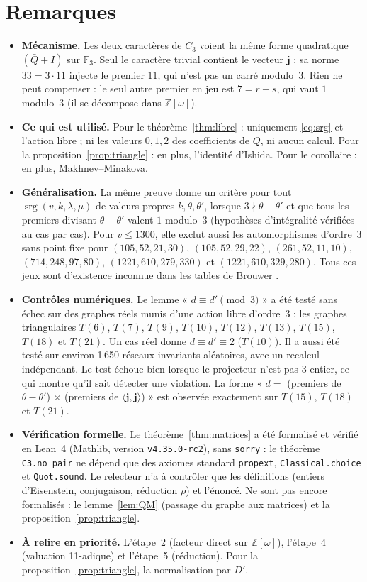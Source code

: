 \documentclass[11pt,a4paper]{article}
\theoremstyle{remark}
\newcommand{\Z}{\mathbb{Z}}
\newcommand{\F}{\mathbb{F}}
\newcommand{\one}{\mathbf{j}}
\newcommand{\srg}{\operatorname{srg}}
\begin{document}
\section{Remarques}

\begin{itemize}[leftmargin=*]
\item \textbf{Mécanisme.} Les deux caractères de $C_3$ voient la même forme quadratique $(\bar Q+I)$ sur $\F_3$. Seul le
caractère trivial contient le vecteur $\one$ ; sa norme $33=3\cdot11$ injecte le premier $11$, qui n'est pas un carré modulo~3.
Rien ne peut compenser : le seul autre premier en jeu est $7=r-s$, qui vaut $1$ modulo~3 (il se décompose dans $\Z[\omega]$).
\item \textbf{Ce qui est utilisé.} Pour le théorème~\ref{thm:libre} : uniquement \eqref{eq:srg} et l'action libre ; ni les valeurs
$0,1,2$ des coefficients de $Q$, ni aucun calcul. Pour la proposition~\ref{prop:triangle} : en plus, l'identité d'Ishida.
Pour le corollaire : en plus, Makhnev--Minakova.
\item \textbf{Généralisation.} La même preuve donne un critère pour tout $\srg(v,k,\lambda,\mu)$ de valeurs propres $k,\theta,\theta'$,
lorsque $3\nmid\theta-\theta'$ et que tous les premiers divisant $\theta-\theta'$ valent $1$ modulo~3 (hypothèses d'intégralité
vérifiées au cas par cas). Pour $v\le1300$, elle exclut
aussi les automorphismes d'ordre~3 sans point fixe pour $(105,52,21,30)$, $(105,52,29,22)$, $(261,52,11,10)$, $(714,248,97,80)$,
$(1221,610,279,330)$ et $(1221,610,329,280)$. Tous ces jeux sont d'existence inconnue dans les tables de Brouwer \cite{Br}.
\item \textbf{Contrôles numériques.} Le lemme « $d\equiv d'\pmod3$ » a été testé sans échec sur des graphes réels munis d'une action
libre d'ordre~3 : les graphes triangulaires $T(6)$, $T(7)$, $T(9)$, $T(10)$, $T(12)$, $T(13)$, $T(15)$, $T(18)$ et $T(21)$. Un cas réel donne $d\equiv d'\equiv2$ ($T(10)$). Il a
aussi été testé sur environ 1\,650 réseaux invariants aléatoires, avec un recalcul indépendant. Le test échoue bien lorsque le projecteur
n'est pas 3-entier, ce qui montre qu'il sait détecter une violation. La forme « $d=$ (premiers de $\theta-\theta'$) $\times$
(premiers de $\langle\one,\one\rangle$) » est observée exactement sur $T(15)$, $T(18)$ et $T(21)$.
\item \textbf{Vérification formelle.} Le théorème~\ref{thm:matrices} a été formalisé et vérifié en Lean~4
(Mathlib, version \texttt{v4.35.0-rc2}), sans \texttt{sorry} : le théorème \texttt{C3.no\_pair} ne dépend que des
axiomes standard \texttt{propext}, \texttt{Classical.choice} et \texttt{Quot.sound}. Le relecteur n'a à contrôler que
les définitions (entiers d'Eisenstein, conjugaison, réduction $\rho$) et l'énoncé. Ne sont pas encore formalisés :
le lemme~\ref{lem:QM} (passage du graphe aux matrices) et la proposition~\ref{prop:triangle}.
\item \textbf{À relire en priorité.} L'étape~2 (facteur direct sur $\Z[\omega]$), l'étape~4 (valuation 11-adique) et
l'étape~5 (réduction). Pour la proposition~\ref{prop:triangle}, la normalisation par $D'$.
\end{itemize}
\end{document}
